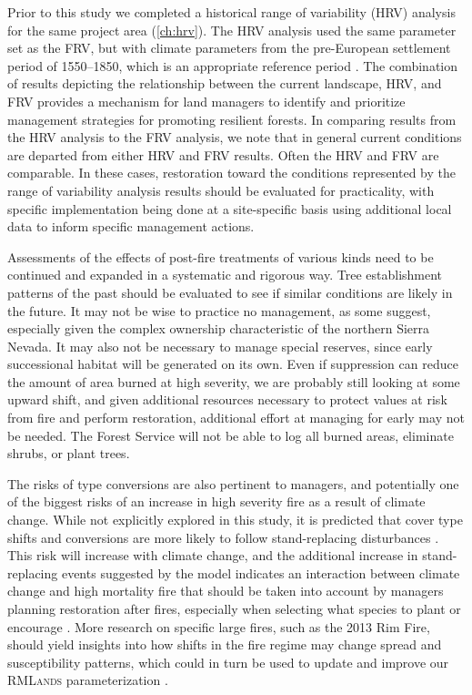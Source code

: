 Prior to this study we completed a historical range of variability (HRV) analysis for the same project area (\ref{ch:hrv}). The HRV analysis used the same parameter set as the FRV, but with climate parameters from the pre-European settlement period of 1550--1850, which is an appropriate reference period \citep{Safford2013}. The combination of results depicting the relationship between the current landscape, HRV, and FRV provides a mechanism for land managers to identify and prioritize management strategies for promoting resilient forests. In comparing results from the HRV analysis to the FRV analysis, we note that in general current conditions are departed from either HRV and FRV results. Often the HRV and FRV are comparable. In these cases, restoration toward the conditions represented by the range of variability analysis results should be evaluated for practicality, with specific implementation being done at a site-specific basis using additional local data to inform specific management actions.


Assessments of the effects of post-fire treatments of various kinds need to be continued and expanded in a systematic and rigorous way. Tree establishment patterns of the past should be evaluated to see if similar conditions are likely in the future. It may not be wise to practice no management, as some suggest, especially given the complex ownership characteristic of the northern Sierra Nevada. It may also not be necessary to manage special reserves, since early successional habitat will be generated on its own. Even if suppression can reduce the amount of area burned at high severity, we are probably still looking at some upward shift, and given additional resources necessary to protect values at risk from fire and perform restoration, additional effort at managing for early may not be needed. The Forest Service will not be able to log all burned areas, eliminate shrubs, or plant trees. 

The risks of type conversions are also pertinent to managers, and potentially one of the biggest risks of an increase in high severity fire as a result of climate change. While not explicitly explored in this study, it is predicted that cover type shifts and conversions are more likely to follow stand-replacing disturbances \citep{Stephens2013}. This risk will increase with climate change, and the additional increase in stand-replacing events suggested by the model indicates an interaction between climate change and high mortality fire that should be taken into account by managers planning restoration after fires, especially when selecting what species to plant or encourage \citep{Fule2008,Schwartz2015}. More research on specific large fires, such as the 2013 Rim Fire, should yield insights into how shifts in the fire regime may change spread and susceptibility patterns, which could in turn be used to update and improve our \textsc{RMLands} parameterization \citep{Lydersen2014}.


